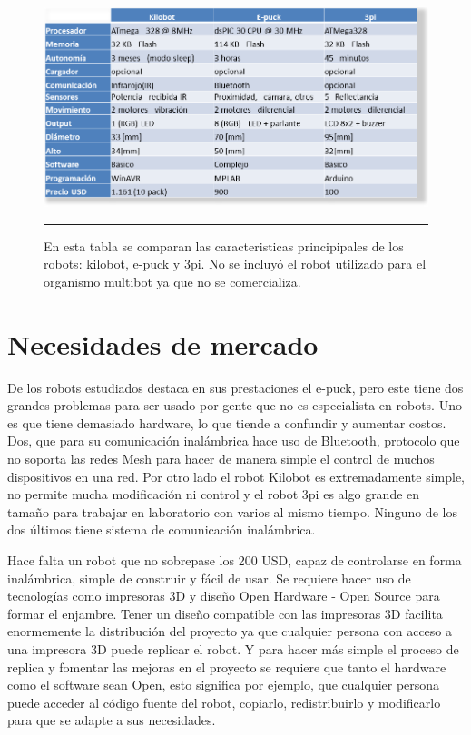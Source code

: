 \begin{figure}[htbp]
	\centering
		\includegraphics[width=1\textwidth]{./Figures/tabla_robots.png}
		\rule{35em}{0.5pt}
	\caption[Tabla comparativa robots]{En esta tabla se comparan las caracteristicas principipales de los robots: kilobot, e-puck y 3pi. No se incluyó el robot utilizado para el organismo multibot ya que no se comercializa.}
	\label{fig:Tabla robots}
\end{figure}

\section{Necesidades de mercado}

De los robots estudiados destaca en sus prestaciones el e-puck, pero este tiene dos grandes problemas para ser usado por gente que no es especialista en robots. Uno es que tiene demasiado hardware, lo que tiende a confundir y aumentar costos. Dos, que para su comunicación inalámbrica hace uso de Bluetooth, protocolo que no soporta las redes Mesh para hacer de manera simple el control de muchos dispositivos en una red. Por otro lado el robot Kilobot es extremadamente simple, no permite mucha modificación ni control y el robot 3pi es algo grande en tamaño para trabajar en laboratorio con varios al mismo tiempo. Ninguno de los dos últimos tiene sistema de comunicación inalámbrica.

Hace falta un robot que no sobrepase los 200 USD, capaz de controlarse en forma inalámbrica, simple de construir y fácil de usar. Se requiere hacer uso de tecnologías como impresoras 3D y diseño Open Hardware - Open Source para formar el enjambre. Tener un diseño compatible con las impresoras 3D facilita enormemente la distribución del proyecto ya que cualquier persona con acceso a una impresora 3D puede replicar el robot. Y para hacer más simple el proceso de replica y fomentar las mejoras en el proyecto se requiere que tanto el hardware como el software sean Open, esto significa por ejemplo, que cualquier persona puede acceder al código fuente del robot, copiarlo, redistribuirlo y modificarlo para que se adapte a sus necesidades.

